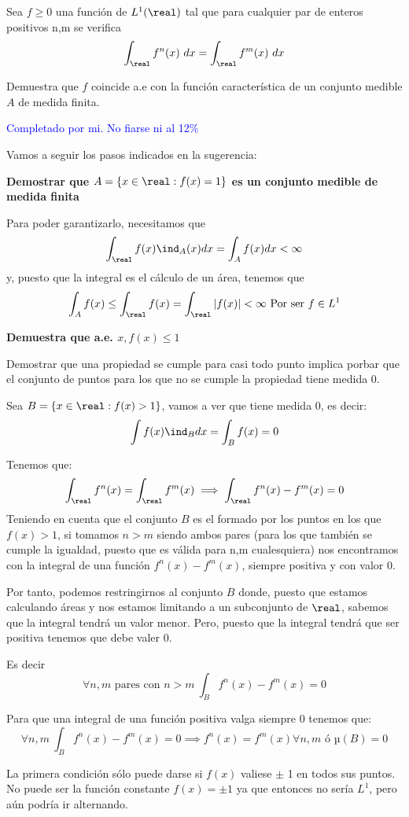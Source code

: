 \begin{problem}[15]
Sea $f\geq 0$ una función de $L^1(\real)$ tal que para cualquier par de enteros positivos n,m se verifica
\[\int_{\real} f^n(x) \ dx=\int_{\real}f^m(x) \ dx\]

Demuestra que $f$ coincide a.e con la función característica de un conjunto medible $A$ de medida finita.

\solution
\textcolor{blue}{Completado por mi. No fiarse ni al 12\%}

Vamos a seguir los pasos indicados en la sugerencia:

\spart
\textbf{Demostrar que $A=\{x \in \real: f(x)=1\}$ es un conjunto medible de medida finita}

Para poder garantizarlo, necesitamos que
\[\int_{\real}f(x)\ind_A(x) dx = \int_A f(x) dx < \infty\]
y, puesto que la integral es el cálculo de un área, tenemos que
\[\int_A f(x) \leq \int_{\real}f(x) = \int_{\real}|f(x)| <\infty \text{ Por ser } f\in L^1\]

\spart
\textbf{Demuestra que a.e. $x, f(x) \leq 1$}

Demostrar que una propiedad se cumple para casi todo punto implica porbar que el conjunto de puntos para los que no se cumple la propiedad tiene medida 0.

Sea $B=\{x \in \real : f(x) > 1\}$, vamos a ver que tiene medida 0, es decir:
\[\int f(x) \ind_B dx = \int_B f(x) = 0\]

Tenemos que:
\[\int_{\real}f^n(x) = \int_{\real}f^m(x) \implies \int_{\real}f^n(x)-f^m(x) = 0\]
Teniendo en cuenta que el conjunto $B$ es el formado por los puntos en los que $f(x)>1$, si tomamos $n>m$ siendo ambos pares (para los que también se cumple la igualdad, puesto que es válida para n,m cualesquiera) nos encontramos con la integral de una función $f^n(x)-f^m(x)$, siempre positiva y con valor 0.

Por tanto, podemos restringirnos al conjunto $B$ donde, puesto que estamos calculando áreas y nos estamos limitando a un subconjunto de $\real$, sabemos que la integral tendrá un valor menor. Pero, puesto que la integral tendrá que ser positiva tenemos que debe valer 0.

Es decir
\[\forall n,m \text{ pares con } n>m \  \int_B f^n(x)-f^m(x) = 0\]

Para que una integral de una función positiva valga siempre 0 tenemos que:
\[\forall n,m \ \int_B f^n(x)-f^m(x) = 0 \implies f^n(x)=f^m(x) \forall n,m \text{ ó } µ(B) = 0\]

La primera condición sólo puede darse si $f(x)$ valiese $\pm$ 1 en todos sus puntos. No puede ser la función constante $f(x) = \pm 1$ ya que entonces no sería $L^1$, pero aún podría ir alternando.


\end{problem}
